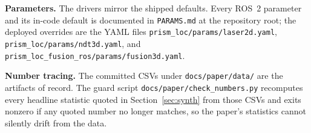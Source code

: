 \textbf{Parameters.}
The drivers mirror the shipped defaults. Every ROS~2 parameter and its
in-code default is documented in \texttt{PARAMS.md} at the repository
root; the deployed overrides are the YAML files
\texttt{prism\_loc/params/laser2d.yaml},
\texttt{prism\_loc/params/ndt3d.yaml}, and
\texttt{prism\_loc\_fusion\_ros/params/fusion3d.yaml}.

\textbf{Number tracing.}
The committed CSVs under \texttt{docs/paper/data/} are the artifacts of
record. The guard script \texttt{docs/paper/check\_numbers.py}
recomputes every headline statistic quoted in Section~\ref{sec:synth}
from those CSVs and exits nonzero if any quoted number no longer
matches, so the paper's statistics cannot silently drift from the data.
